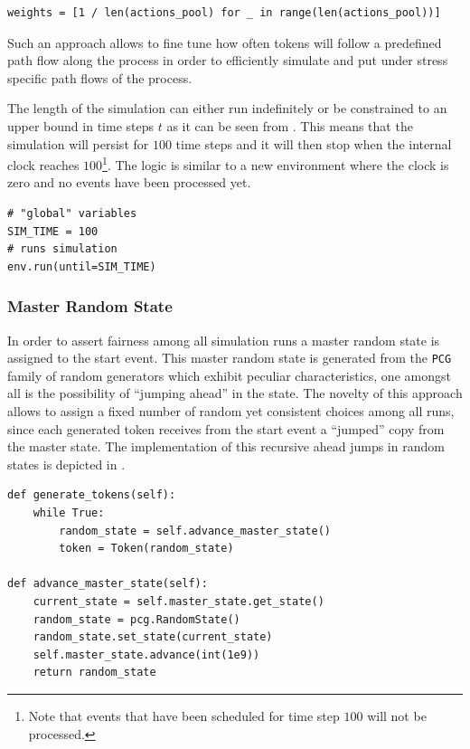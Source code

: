\begin{lstlisting}[caption=Probability weights vector for each path flow,label=lst:probabilities_path_flow,style=CustomPython]
weights = [1 / len(actions_pool) for _ in range(len(actions_pool))]
\end{lstlisting}

Such an approach allows to fine tune how often tokens will follow a predefined path flow along the process in order to efficiently simulate and put under stress specific path flows of the process.

The length of the simulation can either run indefinitely or be constrained to an upper bound in time steps $t$ as it can be seen from . This means that the simulation will persist for $100$ time steps and it will then stop when the internal clock reaches $100$\footnote{Note that events that have been scheduled for time step $100$ will not be processed.}. The logic is similar to a new environment where the clock is zero and no events have been processed yet.

\begin{lstlisting}[caption=Starting the simulation with discrete time steps,label=lst:simulation_steps,style=CustomPython]
# "global" variables
SIM_TIME = 100
# runs simulation
env.run(until=SIM_TIME)
\end{lstlisting}

\subsubsection{Master Random State}

In order to assert fairness among all simulation runs a master random state is assigned to the start event. This master random state is generated from the \texttt{PCG} family of random generators which exhibit peculiar characteristics, one amongst all is the possibility of ``jumping ahead'' in the state. The novelty of this approach allows to assign a fixed number of random yet consistent choices among all runs, since each generated token receives from the start event a ``jumped'' copy from the master state. The implementation of this recursive ahead jumps in random states is depicted in .

\begin{lstlisting}[caption=Master random state jump ahead,label=lst:random_state_jump,style=CustomPython]
def generate_tokens(self):
    while True:
        random_state = self.advance_master_state()
        token = Token(random_state)

def advance_master_state(self):
    current_state = self.master_state.get_state()
    random_state = pcg.RandomState()
    random_state.set_state(current_state)
    self.master_state.advance(int(1e9))
    return random_state
\end{lstlisting}

